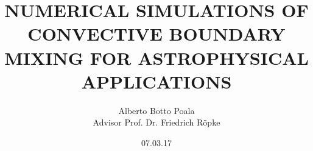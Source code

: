 \documentclass[12pt]{book}
\title{NUMERICAL SIMULATIONS OF CONVECTIVE BOUNDARY MIXING FOR ASTROPHYSICAL APPLICATIONS}
\author{Alberto Botto Poala\\
Advisor Prof. Dr. Friedrich Röpke}
\date{07.03.17}
\numberwithin{equation}{section}
\begin{document}
\renewcommand{\arraystretch}{1.2}
\prntlen{\textwidth} \\
\the\textwidth









\tableofcontents






\clearpage


\end{document}
